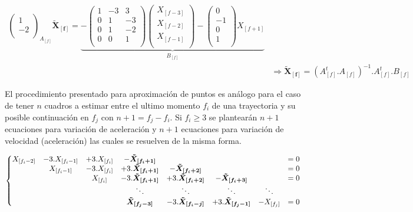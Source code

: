 {\begin{equation}
\begin{split}
{\begin{pmatrix}
1\\
-2\\
\end{pmatrix}
}_{A_{[f]}}\boldsymbol{\tilde{X}_{[f]}} = \underbrace{- \begin{pmatrix}
1 &-3 &3\\
0 &1 &-3\\
0 &1 &-2\\
0 &0 &1\\
\end{pmatrix}
\begin{pmatrix}
X_{[f-3]}\\
X_{[f-2]}\\
X_{[f-1]}\\
\end{pmatrix} - \begin{pmatrix}
0\\
-1\\
0\\
1\\
\end{pmatrix}
X_{[f+1]}}_{B_{[f]}} \\
&\Rightarrow \boldsymbol{\tilde{X}_{[f]}} = \left( A_{[f]}^{t}.A_{[f]}\right)^{-1}.A_{[f]}^{t}.B_{[f]}
\end{split}
\label{matrices_estimacion_01}
\end{equation}}

El procedimiento presentado para aproximación de puntos es análogo para el caso de tener $n$ cuadros a estimar entre el ultimo momento $f_{i}$ de una trayectoria y su posible continuación en $f_{j}$ con $n+1=f_{j}-f_{i}$. Si $f_{i} \geq 3$ se plantearán $n+1$ ecuaciones para variación de aceleración y $n+1$ ecuaciones para variación de velocidad (aceleración) las cuales se resuelven de la misma forma. 

{\scriptsize \begin{equation}
\hspace{-0cm}
\left\{
\begin{matrix}
X_{[f_{i}-2]} &-3.X_{[f_{i}-1]} &+3.X_{[f_{i}]} &-\boldsymbol{\tilde{X}_{[f_{i}+1]}} & & & &=0 \\
& X_{[f_{i}-1]} &-3.X_{[f_{i}]} &+3.\boldsymbol{\tilde{X}_{[f_{i}+1]}} &-\boldsymbol{\tilde{X}_{[f_{i}+2]}} & & &=0 \\
& & X_{[f_{i}]} &-3.\boldsymbol{\tilde{X}_{[f_{i}+1]}} &+3.\boldsymbol{\tilde{X}_{[f_{i}+2]}} &-\boldsymbol{\tilde{X}_{[f_{i}+3]}}& &=0 \\
& & & \ddots & \ddots & \ddots & \ddots & \\
& & & \boldsymbol{\tilde{X}_{[f_{j}-3]}} &-3.\boldsymbol{\tilde{X}_{[f_{i}-j]}} &+3.\boldsymbol{\tilde{X}_{[f_{j}-1]}} &-X_{[f_{j}]} &=0 \\
\end{matrix}
\right.
\label{ecuaciones_estimacion_n}
\end{equation}}

